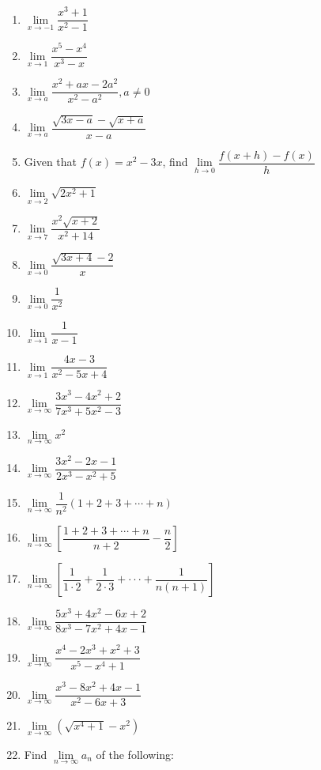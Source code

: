 \documentclass{report}
\begin{document}
\begin{multicols}{2}
\begin{enumerate}
            \item $\lim\limits_{x\to{-1}}{\dfrac{x^{3}+1}{x^{2}-1}}$
            \item $\lim\limits_{x\to1}{\dfrac{x^{5}-x^{4}}{x^{3}-x}}$
            \item $\lim\limits_{x\to a}{\dfrac{x^{2}+a x-2a^{2}}{x^{2}-a^{2}}},a\neq0$
            \item $\lim\limits_{x\to a}{\dfrac{\sqrt{3x-a}-{\sqrt{x+a}}}{x-a}}$
            \item Given that $f(x) = x^2 - 3x$, find $\lim\limits_{h\to0}\dfrac{f(x+h)-f(x)}{h}$
            \item $\lim\limits_{x\to2}{\sqrt{2x^{2}+1}}$
            \item $\lim\limits_{x\to7}\dfrac{x^{2}\sqrt{x+2}}{x^{2}+14}$
            \item $\lim\limits_{x\to0}{\dfrac{{\sqrt{3x+4}-2}}{x}}$
            \item $\lim\limits_{x\to0}{\dfrac{1}{x^{2}}}$
            \item $\lim\limits_{x\to1}{\dfrac{1}{x-1}}$
            \item $\lim\limits_{x\to1}{\dfrac{4x-3}{x^{2}-5x+4}}$
            \item $\lim\limits_{x\to\infty}{\dfrac{3x^{3}-4x^{2}+2}{7x^{3}+5x^{2}-3}}$
            \item $\lim\limits_{n\to\infty}x^{2}$
            \item $\lim\limits_{x\to\infty}{\dfrac{3x^{2}-2x-1}{2x^{3}-x^{2}+5}}$
            \item $\lim\limits_{n\to\infty}\dfrac{1}{n^{2}}(1+2+3+\cdots+n)$
            \item $\lim\limits_{n\to\infty}\left[{\dfrac{1+2+3+\cdots+n}{n+2}}-{\dfrac{n}{2}}\right]$
            \item $\lim\limits_{n\to\infty}\left[{\dfrac{1}{1\cdot2}}+{\dfrac{1}{2\cdot3}}+\cdot\cdot\cdot+{\dfrac{1}{n(n+1)}}\right]$
            \item $\lim\limits_{x\to\infty}{\dfrac{5x^{3}+4x^{2}-6x+2}{8x^{3}-7x^{2}+4x-1}}$
            \item $\lim\limits_{x\to\infty}{\dfrac{x^{4}-2x^{3}+x^{2}+3}{x^{5}-x^{4}+1}}$
            \item $\lim\limits_{x\to\infty}{\dfrac{x^{3}-8x^{2}+4x-1}{x^{2}-6x+3}}$
            \item $\lim\limits_{x\to\infty}(\sqrt{x^{4}+1}-x^{2})$
            \item Find $\lim\limits_{n \to \infty}a_n$ of the following:

\end{enumerate}
\end{multicols}
\end{document}
